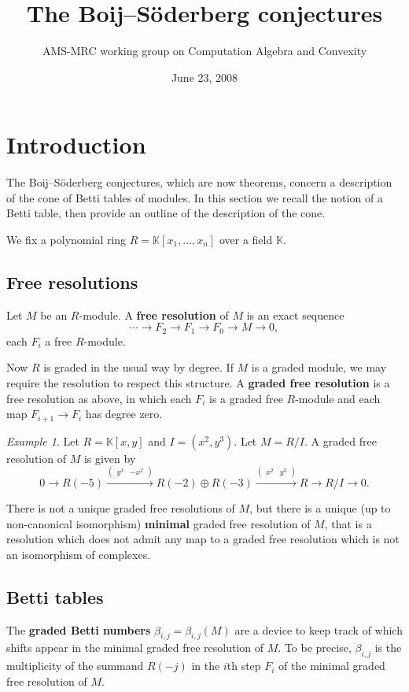 \documentclass[12pt]{amsart}
\title{The Boij--S\"{o}derberg conjectures}
\author{AMS-MRC working group on Computation Algebra and Convexity}
\date{June 23, 2008}
\theoremstyle{plain}
\theoremstyle{definition}
\theoremstyle{remark}
\newtheorem{example}[thm]{Example}
\newcommand{\field}{\mathbb{K}}
\newcommand{\defining}[1]{\textbf{#1}}
\begin{document}


\maketitle

\section{Introduction}
The Boij--S\"{o}derberg conjectures, which are now theorems,
concern a description of the cone of Betti tables of modules.
In this section we recall the notion of a Betti table,
then provide an outline of the description of the cone.

We fix a polynomial ring $R = \field[x_1,\dots,x_n]$ over a field $\field$.
\subsection{Free resolutions}
Let $M$ be an $R$-module.
A \defining{free resolution} of $M$ is an exact sequence
\[
  \cdots \to F_2 \to F_1 \to F_0 \to M \to 0 ,
\]
each $F_i$ a free $R$-module.

Now $R$ is graded in the usual way by degree.
If $M$ is a graded module, we may require the resolution to respect this structure.
A \defining{graded free resolution} is a free resolution as above,
in which each $F_i$ is a graded free $R$-module
and each map $F_{i+1} \to F_i$ has degree zero.

\begin{example}
Let $R = \field[x,y]$ and $I = (x^2,y^3)$.
Let $M = R/I$.
A graded free resolution of $M$ is given by
\[
  0 \to R(-5) \overset{\begin{pmatrix} y^3 & -x^2 \end{pmatrix}}{\longrightarrow}
           R(-2) \oplus R(-3) \overset{\begin{pmatrix} x^2 & y^3 \end{pmatrix}}{\longrightarrow}  R \to R/I \to 0 .
\]
\end{example}

There is not a unique graded free resolutions of $M$,
but there is a unique (up to non-canonical isomorphism)
\defining{minimal} graded free resolution of $M$,
that is a resolution which does not admit any map to a graded free resolution
which is not an isomorphism of complexes.

\subsection{Betti tables}
The \defining{graded Betti numbers} $\beta_{i,j} = \beta_{i,j}(M)$
are a device to keep track of which shifts appear in the minimal graded free resolution of $M$.
To be precise, $\beta_{i,j}$ is the multiplicity of the summand $R(-j)$
in the $i$th step $F_i$ of the minimal graded free resolution of $M$.
\end{document}

